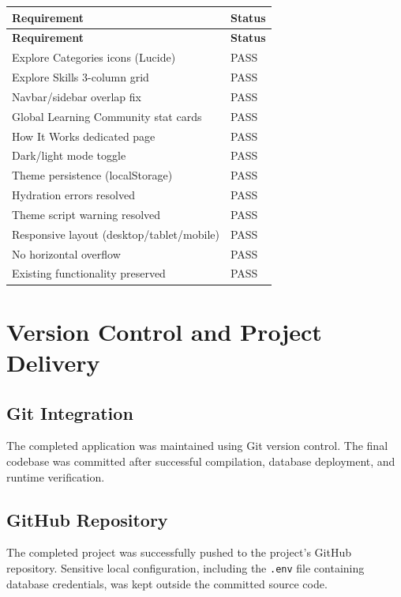 \documentclass[12pt,a4paper]{report}
\begin{document}
\begin{longtable}{@{} l l @{}}
\toprule
\textbf{Requirement} & \textbf{Status} \\
\midrule
\endfirsthead
\toprule
\textbf{Requirement} & \textbf{Status} \\
\midrule
\endhead
Explore Categories icons (Lucide)            & PASS \\
Explore Skills 3-column grid                 & PASS \\
Navbar/sidebar overlap fix                   & PASS \\
Global Learning Community stat cards         & PASS \\
How It Works dedicated page                  & PASS \\
Dark/light mode toggle                       & PASS \\
Theme persistence (localStorage)             & PASS \\
Hydration errors resolved                    & PASS \\
Theme script warning resolved                & PASS \\
Responsive layout (desktop/tablet/mobile)    & PASS \\
No horizontal overflow                       & PASS \\
Existing functionality preserved             & PASS \\
\bottomrule
\end{longtable}

\chapter{Version Control and Project Delivery}

\section{Git Integration}
The completed application was maintained using Git version control.  The final
codebase was committed after successful compilation, database deployment, and
runtime verification.

\section{GitHub Repository}
The completed project was successfully pushed to the project's GitHub
repository.  Sensitive local configuration, including the \texttt{.env} file
containing database credentials, was kept outside the committed source code.
\end{document}
